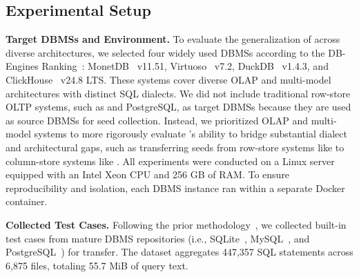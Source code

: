 \documentclass[conference]{IEEEtran}
\begin{document}
\subsection{Experimental Setup}
\label{sec:setup}

\textbf{Target DBMSs and Environment.}
To evaluate the generalization of \tool{} across diverse architectures, we selected four widely used DBMSs according to the DB-Engines Ranking~\cite{dbengines}: MonetDB~\cite{monetdb} v11.51, Virtuoso~\cite{virtuoso} v7.2, DuckDB~\cite{duckdb_git} v1.4.3, and ClickHouse~\cite{clickhouse} v24.8 LTS. These systems cover diverse OLAP and multi-model architectures with distinct SQL dialects.
We did not include traditional row-store OLTP systems, such as \mysql{} and PostgreSQL, as target DBMSs because they are used as source DBMSs for seed collection. Instead, we prioritized OLAP and multi-model systems to more rigorously evaluate \tool{}'s ability to bridge substantial dialect and architectural gaps, such as transferring seeds from row-store systems like \mysql{} to column-store systems like \duckdb{}.
All experiments were conducted on a Linux server equipped with an Intel Xeon CPU and 256 GB of RAM. To ensure reproducibility and isolation, each DBMS instance ran within a separate Docker container.

\textbf{Collected Test Cases.}
Following the prior methodology~\cite{fu2024sedar}, we collected built-in test cases from mature DBMS repositories (i.e., SQLite~\cite{sqlite}, MySQL~\cite{mysql}, and PostgreSQL~\cite{pg}) for transfer. 
The dataset aggregates 447,357 SQL statements across 6,875 files, totaling 55.7 MiB of query text.

\end{document}
